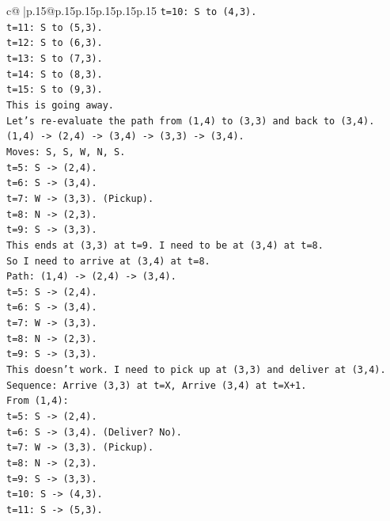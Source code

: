 \documentclass{article}
\begin{document}
{\begin{supertabular}{c@{$\;$}|p{.15\linewidth}@{}p{.15\linewidth}p{.15\linewidth}p{.15\linewidth}p{.15\linewidth}p{.15\linewidth}}
{{{\texttt{t=10: S to (4,3).} \\
\texttt{t=11: S to (5,3).} \\
\texttt{t=12: S to (6,3).} \\
\texttt{t=13: S to (7,3).} \\
\texttt{t=14: S to (8,3).} \\
\texttt{t=15: S to (9,3).} \\
\texttt{This is going away.} \\
\texttt{Let's re{-}evaluate the path from (1,4) to (3,3) and back to (3,4).} \\
\texttt{(1,4) {-}> (2,4) {-}> (3,4) {-}> (3,3) {-}> (3,4).} \\
\texttt{Moves: S, S, W, N, S.} \\
\texttt{t=5: S {-}> (2,4).} \\
\texttt{t=6: S {-}> (3,4).} \\
\texttt{t=7: W {-}> (3,3). (Pickup).} \\
\texttt{t=8: N {-}> (2,3).} \\
\texttt{t=9: S {-}> (3,3).} \\
\texttt{This ends at (3,3) at t=9. I need to be at (3,4) at t=8.} \\
\texttt{So I need to arrive at (3,4) at t=8.} \\
\texttt{Path: (1,4) {-}> (2,4) {-}> (3,4).} \\
\texttt{t=5: S {-}> (2,4).} \\
\texttt{t=6: S {-}> (3,4).} \\
\texttt{t=7: W {-}> (3,3).} \\
\texttt{t=8: N {-}> (2,3).} \\
\texttt{t=9: S {-}> (3,3).} \\
\texttt{This doesn't work. I need to pick up at (3,3) and deliver at (3,4).} \\
\texttt{Sequence: Arrive (3,3) at t=X, Arrive (3,4) at t=X+1.} \\
\texttt{From (1,4):} \\
\texttt{t=5: S {-}> (2,4).} \\
\texttt{t=6: S {-}> (3,4). (Deliver? No).} \\
\texttt{t=7: W {-}> (3,3). (Pickup).} \\
\texttt{t=8: N {-}> (2,3).} \\
\texttt{t=9: S {-}> (3,3).} \\
\texttt{t=10: S {-}> (4,3).} \\
\texttt{t=11: S {-}> (5,3).} \\
}}}
\end{supertabular}}
\end{document}
